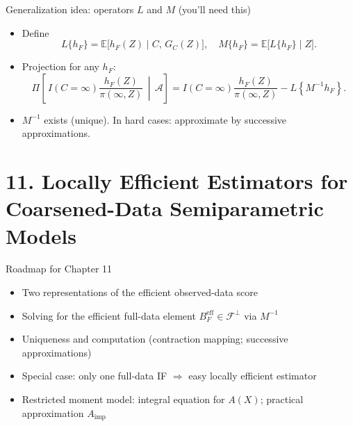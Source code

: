 \documentclass[xcolor=dvipsnames,aspectratio=169]{beamer}
\newcommand{\E}{\mathbb{E}}
\newcommand{\1}{\mathbbm{1}}
\begin{document}
\begin{frame}{Generalization idea: operators $L$ and $M$ (you’ll need this)}
  \begin{itemize}
    \item Define 
      \[
        L\{h_F\}=\E\!\big[h_F(Z)\mid C,\,G_C(Z)\big],\quad
        M\{h_F\}=\E\!\big[L\{h_F\}\mid Z\big].
      \]
    \item Projection for any $h_F$:
      \[
      \Pi\!\left[\,I(C=\infty)\frac{h_F(Z)}{\pi(\infty,Z)}\,\middle|\,\mathcal{A}\right]
      = I(C=\infty)\frac{h_F(Z)}{\pi(\infty,Z)} - L\!\left\{M^{-1}h_F\right\}.
      \]
    \item $M^{-1}$ exists (unique). In hard cases: approximate by successive approximations.
  \end{itemize}
\end{frame}

\section{11. Locally Efficient Estimators for Coarsened-Data Semiparametric Models}

\begin{frame}{Roadmap for Chapter 11}
  \begin{itemize}
    \item Two representations of the efficient observed-data score
    \item Solving for the efficient full-data element $B_F^{\text{eff}}\in\mathcal{F}^{\perp}$ via $M^{-1}$
    \item Uniqueness and computation (contraction mapping; successive approximations)
    \item Special case: only one full-data IF $\Rightarrow$ easy locally efficient estimator
    \item Restricted moment model: integral equation for $A(X)$; practical approximation $A_{\text{imp}}$
  \end{itemize}
\end{frame}
\end{document}
